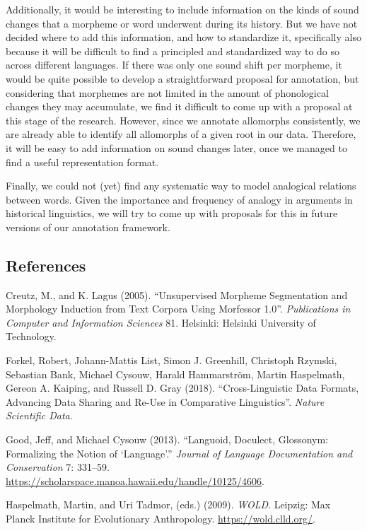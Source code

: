 \documentclass[
  a4paper,
  14pt,
  oneside,
  tablecaptionabove
]{scrbook}
\begin{document}
Additionally, it would be interesting to include information on the
kinds of sound changes that a morpheme or word underwent during its
history. But we have not decided where to add this information, and how
to standardize it, specifically also because it will be difficult to
find a principled and standardized way to do so across different
languages. If there was only one sound shift per morpheme, it would be
quite possible to develop a straightforward proposal for annotation, but
considering that morphemes are not limited in the amount of phonological
changes they may accumulate, we find it difficult to come up with a
proposal at this stage of the research. However, since we annotate
allomorphs consistently, we are already able to identify all allomorphs
of a given root in our data. Therefore, it will be easy to add
information on sound changes later, once we managed to find a useful
representation format.

Finally, we could not (yet) find any systematic way to model analogical
relations between words. Given the importance and frequency of analogy
in arguments in historical linguistics, we will try to come up with
proposals for this in future versions of our annotation framework.

\pagebreak
\subsection*{References}

\nopagebreak\hangindent=0.7cm {\small Creutz, M., and K. Lagus (2005). ``Unsupervised Morpheme
Segmentation and Morphology Induction from Text Corpora Using Morfessor
1.0''. \emph{Publications in Computer and Information Sciences} 81. Helsinki:
Helsinki University of Technology. }


\nopagebreak\hangindent=0.7cm {\small Forkel, Robert, Johann-Mattis List, Simon J. Greenhill, Christoph
Rzymski, Sebastian Bank, Michael Cysouw, Harald Hammarström, Martin
Haspelmath, Gereon A. Kaiping, and Russell D. Gray (2018).
``Cross-Linguistic Data Formats, Advancing Data Sharing and
Re-Use in Comparative Linguistics''. \emph{Nature Scientific Data}. }


\nopagebreak\hangindent=0.7cm {\small Good, Jeff, and Michael Cysouw (2013). ``Languoid, Doculect,
Glossonym: Formalizing the Notion of `Language'.'' \emph{Journal
of Language Documentation and Conservation} 7: 331--59.
\url{https://scholarspace.manoa.hawaii.edu/handle/10125/4606}. }

\nopagebreak\hangindent=0.7cm {\small Haspelmath, Martin, and Uri Tadmor, (eds.) (2009). \emph{WOLD}.  Leipzig:
Max Planck Institute for Evolutionary Anthropology.
\url{https://wold.clld.org/}. }
\end{document}
